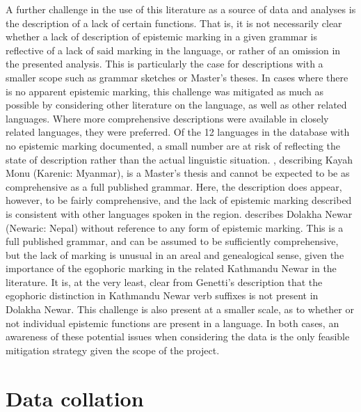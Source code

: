 A further challenge in the use of this literature as a source of data and analyses is the description of a lack of certain functions. That is, it is not necessarily clear whether a lack of description of epistemic marking in a given grammar is reflective of a lack of said marking in the language, or rather of an omission in the presented analysis. This is particularly the case for descriptions with a smaller scope such as grammar sketches or Master's theses. In cases where there is no apparent epistemic marking, this challenge was mitigated as much as possible by considering other literature on the language, as well as other related languages. Where more comprehensive descriptions were available in closely related languages, they were preferred. Of the 12 languages in the database with no epistemic marking documented, a small number are at risk of reflecting the state of description rather than the actual linguistic situation. , describing Kayah Monu (Karenic: Myanmar), is a Master's thesis and cannot be expected to be as comprehensive as a full published grammar. Here, the description does appear, however, to be fairly comprehensive, and the lack of epistemic marking described is consistent with other languages spoken in the region.  describes Dolakha Newar (Newaric: Nepal) without reference to any form of epistemic marking. This is a full published grammar, and can be assumed to be sufficiently comprehensive, but the lack of marking is unusual in an areal and genealogical sense, given the importance of the egophoric marking in the related Kathmandu Newar in the literature. It is, at the very least, clear from Genetti's description that the egophoric distinction in Kathmandu Newar verb suffixes is not present in Dolakha Newar. This challenge is also present at a smaller scale, as to whether or not individual epistemic functions are present in a language. In both cases, an awareness of these potential issues when considering the data is the only feasible mitigation strategy given the scope of the project. 

\section{Data collation}\label{s:Methods:Schema}
